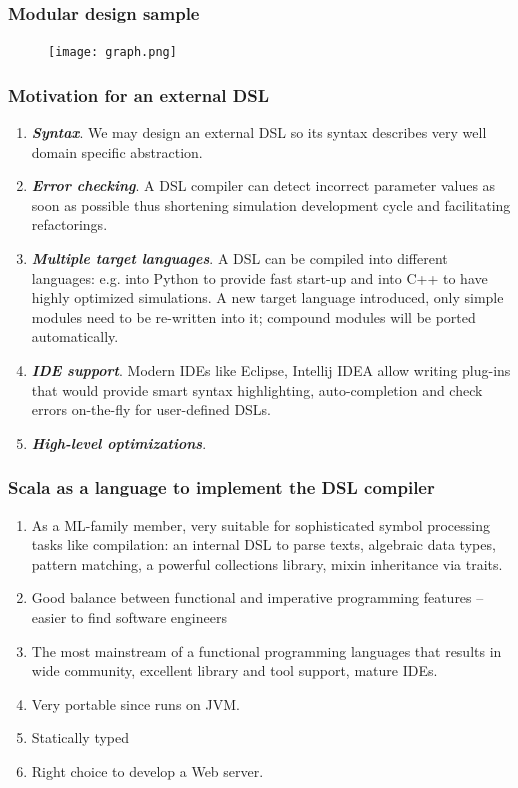 \documentclass{beamer}
\begin{document}
\begin{frame}
\frametitle{Modular design sample}
\begin{figure}[htbp]
\centering
\texttt{[image: graph.png]}
\end{figure}
\end{frame}
\begin{frame}
\frametitle{Motivation for an external DSL}
\begin{enumerate}
  \item \textbf{\textit{Syntax}}. We may design an external DSL so its syntax describes very well domain specific abstraction.
  \item \textbf{\textit{Error checking}}. A DSL compiler can detect incorrect parameter values as soon as possible thus shortening simulation development cycle and facilitating refactorings.
  \item \textbf{\textit{Multiple target languages}}. A DSL can be compiled into different languages: e.g. into Python to provide fast start-up and into C++ to have highly optimized simulations. A new target language introduced, only simple modules need to be re-written into it; compound modules will be ported automatically.
  \item \textbf{\textit{IDE support}}. Modern IDEs like Eclipse, Intellij IDEA allow writing plug-ins that would provide smart syntax highlighting, auto-completion and check errors on-the-fly for user-defined DSLs.
  \item \textbf{\textit{High-level optimizations}}. 
\end{enumerate}
\end{frame}
\begin{frame}
\frametitle{Scala as a language to implement the DSL compiler}
\begin{enumerate}
  \item As a ML-family member, very suitable for sophisticated symbol processing tasks like compilation: an internal DSL to parse texts, algebraic data types, pattern matching, a powerful collections library, mixin inheritance via traits.
  \item Good balance between functional and imperative programming features -- easier to find software engineers
  \item The most mainstream of a functional programming languages that results in wide community, excellent library and tool support, mature IDEs.
  \item Very portable since runs on JVM.
  \item Statically typed
  \item Right choice to develop a Web server.
\end{enumerate}
\end{frame}
\end{document}
